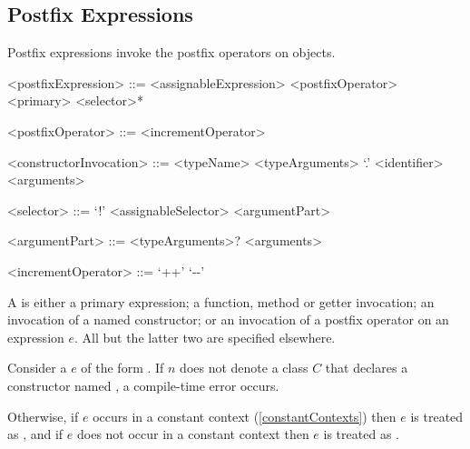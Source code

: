 \documentclass[makeidx]{article}
\begin{document}
{



\subsection{Postfix Expressions}

\LMHash{}%
Postfix expressions invoke the postfix operators on objects.

\begin{grammar}
<postfixExpression> ::= <assignableExpression> <postfixOperator>
  \alt <primary> <selector>*

<postfixOperator> ::= <incrementOperator>

<constructorInvocation> ::= \gnewline{}
  <typeName> <typeArguments> `.' <identifier> <arguments>

<selector> ::= `!'
  \alt <assignableSelector>
  \alt <argumentPart>

<argumentPart> ::=
  <typeArguments>? <arguments>

<incrementOperator> ::= `++'
  \alt `-\mbox-'
\end{grammar}

\LMHash{}%
A  is either a primary expression;
a function, method or getter invocation;
an invocation of a named constructor;
or an invocation of a postfix operator on an expression $e$.
All but the latter two are specified elsewhere.

\LMHash{}%
Consider a  $e$ of the form
.
If $n$ does not denote a class $C$
that declares a constructor named ,
a compile-time error occurs.

\LMHash{}%
Otherwise, if $e$ occurs in a constant context
(\ref{constantContexts})
then $e$ is treated as ,
and if $e$ does not occur in a constant context
then $e$ is treated as .

\EndCase

}
\end{document}
